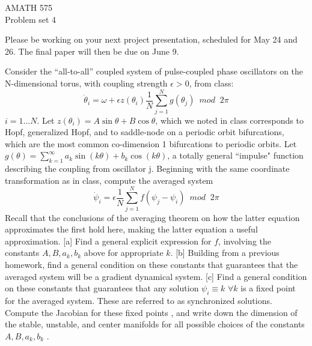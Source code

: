 \documentclass{article}
\begin{document}
\begin{center}
AMATH 575 \\
Problem set 4\\[.3in]
\end{center}



\begin{list}
   {}
    {\setlength{\rightmargin}{\leftmargin}}

 \item Please be working on your next project presentation, scheduled for May 24 and 26.   The final paper will then be due on June 9.   
 
 \item  Consider the ``all-to-all'' coupled system of pulse-coupled phase oscillators on the N-dimensional torus, with coupling strength $\epsilon>0$, from class:
 \begin{equation}
\dot \theta_i = \omega + \epsilon z(\theta_i) \frac{1}{N} \sum_{j=1}^N g(\theta_j) \, \, \,  mod \; \; 2 \pi  
\end{equation}
$i=1...N$.  Let $z(\theta_i)=A \sin \theta + B \cos \theta $, which we noted in class corresponds to Hopf, generalized Hopf, and to saddle-node on a periodic orbit bifurcations, which are the most common co-dimension 1 bifurcations to periodic orbits.  Let $g(\theta) = \sum_{k=1}^\infty a_k \sin(k \theta) + b_k \cos(k \theta)$, a totally general ``impulse" function describing the coupling from oscillator j.  Beginning with the same coordinate transformation as in class, compute the averaged system
 \begin{equation}
\dot \psi_i =  \epsilon  \frac{1}{N} \sum_{j=1}^N f(\psi_j - \psi_i) \, \, \,  mod \; \; 2 \pi  
\end{equation} 
Recall that the conclusions of the averaging theorem on how the latter equation approximates the first hold here, making the latter equation a useful approximation.
[a] Find a general explicit expression for $f$, involving the constants $A,B, a_k, b_k$ above for appropriate $k$.
[b] Building from a previous homework, find a general condition on these constants that guarantees that the averaged system will be a gradient dynamical system.
[c] Find a general condition on these constants that guarantees that any solution $\psi_i \equiv k$ $\forall k$ is a fixed point for the averaged system.  These are referred to as synchronized solutions. Compute the Jacobian for these fixed points , and write down the dimension of the stable, unstable, and center manifolds for all possible choices of the  constants $A,B, a_k, b_k$ .


\end{list}
\end{document}
